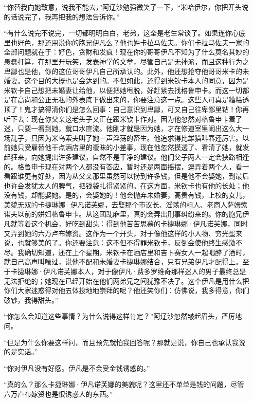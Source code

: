 \par “你替我向她致意，说我不能去，”阿辽沙勉强微笑了一下，“米哈伊尔，你把开头说的话说完了，我再把我的想法告诉你。”
\par “有什么说完不说完，一切都明明白白，老弟，这全是老生常谈了。如果连你心底里也好色，那还用说你的胞兄伊凡么？他也姓卡拉马佐夫。你们卡拉马佐夫一家的全部问题就在于：好色，贪财和发疯！现在你的哥哥伊凡不知为了什么莫名其妙的愚蠢打算，在那里开玩笑，发表神学的文章，尽管自己是无神派，而且这种行为之卑鄙也是他，你的这位哥哥伊凡自己所承认的。此外，他还想抢夺他哥哥米卡的未婚妻。这个目的大概也是会达到的。不但如此，还得到米钦卡本人的同意，因为是米钦卡自己想把未婚妻让给他，以便把她甩脱，好赶紧去找格鲁申卡。而这一切都是在高尚和公正无私的外表底下做出来的，你要注意这一点。这些人可真是糟糕透顶了！鬼才搞得清你们是怎么回事：自己意识到卑鄙，可又自己往卑鄙里钻！你再听下去：现在你父亲这老头子又正在跟米钦卡作对。因为他忽然对格鲁申卡着了迷，只要一看到她，就口水直流。他刚才就是因为她，才在修道室里闹出这么大一场乱子，只因为米乌索夫叫了她一声淫荡的畜生。他追求得比雄猫叫春还厉害。以前她只受雇替他干点酒店里的暧昧的小差事，现在他忽然摸透了、看清了她，就发起狂来，向她提出许多建议，自然不是干净的建议。他们父子两人一定会狭路相逢的。格鲁申卡现在对两个人都没有答应，暂时还是两面摇摆，逗弄着两个人，看一看跟谁更有好处，因为从父亲那里虽然可以捞到许多钱，但是他不会娶她，到最后也许会发犹太人的脾气，把钱袋扎得紧紧的。在这方面，米钦卡也有他的长处；他没有钱，却能娶她。是的，会娶她的！他会抛弃未婚妻，高贵有钱，上校的女儿，美貌无双的卡捷琳娜·伊凡诺芙娜，去娶那个市议长、淫荡的粗人、老商人萨姆索诺夫以前的姘妇格鲁申卡。从这团乱麻里，真的会弄出刑事纠纷来的。你的胞兄伊凡就等着这个机会，好吃到甜头：得到他苦苦思慕的卡捷琳娜·伊凡诺芙娜，同时又弄到她的六万卢布嫁资。这作为一个开头，对于像他这样的小人物、穷光蛋来说，也就够美的了。你还要注意：这不但不得罪米钦卡，反倒会使他终生感激不尽。我确切知道，还在上个星期，米钦卡在酒店里和吉卜赛女人一起喝醉了酒时，就自己高声叫嚷过，说他不配和未婚妻卡捷琳娜结合，只有兄弟伊凡才配得上。至于卡捷琳娜·伊凡诺芙娜本人，对于像伊凡·费多罗维奇那样迷人的男子最终总是无法拒绝的；她现在已经开始在他们两弟兄之间犹豫不决了。这个伊凡是用什么把你们大家迷惑得对他五体投地地崇拜的呢？他还笑你们：仿佛说，我多得意，你们破钞，我得甜头。”
\par “你怎么会知道这些事情？为什么说得这样肯定？”阿辽沙忽然皱起眉头，严厉地问。
\par “但是为什么你要这样问，而且预先就怕我回答呢？那就是说，你自己也承认我说的是实话。”
\par “你对伊凡没有好感。伊凡是不会受金钱诱惑的。”
\par “真的么？那么卡捷琳娜·伊凡诺芙娜的美貌呢？这里还不单单是钱的问题，尽管六万卢布嫁资也是很诱惑人的东西。”
